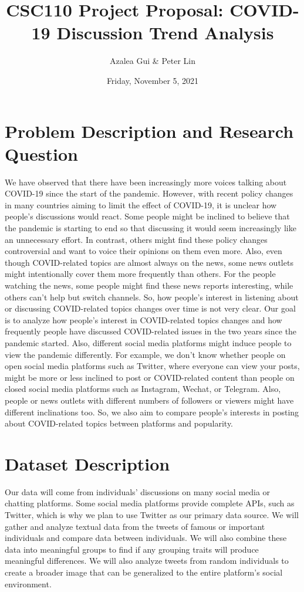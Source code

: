 \documentclass[fontsize=11pt]{article}
\title{CSC110 Project Proposal: COVID-19 Discussion Trend Analysis}
\author{Azalea Gui \& Peter Lin}
\date{Friday, November 5, 2021}
\begin{document}
    \maketitle

    \section*{Problem Description and Research Question}

    \indent

    We have observed that there have been increasingly more voices talking about COVID-19 since the start of the pandemic. However, with recent policy changes in many countries aiming to limit the effect of COVID-19, it is unclear how people’s discussions would react. Some people might be inclined to believe that the pandemic is starting to end so that discussing it would seem increasingly like an unnecessary effort. In contrast, others might find these policy changes controversial and want to voice their opinions on them even more. Also, even though COVID-related topics are almost always on the news, some news outlets might intentionally cover them more frequently than others. For the people watching the news, some people might find these news reports interesting, while others can’t help but switch channels. So, how people’s interest in listening about or discussing COVID-related topics changes over time is not very clear. Our goal is to analyze how people’s interest in COVID-related topics changes and how frequently people have discussed COVID-related issues in the two years since the pandemic started. Also, different social media platforms might induce people to view the pandemic differently. For example, we don’t know whether people on open social media platforms such as Twitter, where everyone can view your posts, might be more or less inclined to post or COVID-related content than people on closed social media platforms such as Instagram, Wechat, or Telegram. Also, people or news outlets with different numbers of followers or viewers might have different inclinations too. So, we also aim to compare people’s interests in posting about COVID-related topics between platforms and popularity.

    \section*{Dataset Description}

    \indent

    Our data will come from individuals’ discussions on many social media or chatting platforms. Some social media platforms provide complete APIs, such as Twitter, which is why we plan to use Twitter as our primary data source. We will gather and analyze textual data from the tweets of famous or important individuals and compare data between individuals. We will also combine these data into meaningful groups to find if any grouping traits will produce meaningful differences. We will also analyze tweets from random individuals to create a broader image that can be generalized to the entire platform’s social environment.
\end{document}
